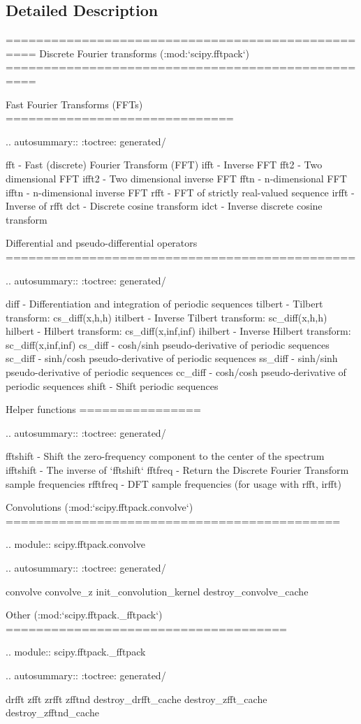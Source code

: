 \subsection{Detailed Description}
\begin{DoxyVerb}==================================================
Discrete Fourier transforms (:mod:`scipy.fftpack`)
==================================================

Fast Fourier Transforms (FFTs)
==============================

.. autosummary::
   :toctree: generated/

   fft - Fast (discrete) Fourier Transform (FFT)
   ifft - Inverse FFT
   fft2 - Two dimensional FFT
   ifft2 - Two dimensional inverse FFT
   fftn - n-dimensional FFT
   ifftn - n-dimensional inverse FFT
   rfft - FFT of strictly real-valued sequence
   irfft - Inverse of rfft
   dct - Discrete cosine transform
   idct - Inverse discrete cosine transform

Differential and pseudo-differential operators
==============================================

.. autosummary::
   :toctree: generated/

   diff - Differentiation and integration of periodic sequences
   tilbert - Tilbert transform:         cs_diff(x,h,h)
   itilbert - Inverse Tilbert transform: sc_diff(x,h,h)
   hilbert - Hilbert transform:         cs_diff(x,inf,inf)
   ihilbert - Inverse Hilbert transform: sc_diff(x,inf,inf)
   cs_diff - cosh/sinh pseudo-derivative of periodic sequences
   sc_diff - sinh/cosh pseudo-derivative of periodic sequences
   ss_diff - sinh/sinh pseudo-derivative of periodic sequences
   cc_diff - cosh/cosh pseudo-derivative of periodic sequences
   shift - Shift periodic sequences

Helper functions
================

.. autosummary::
   :toctree: generated/

   fftshift - Shift the zero-frequency component to the center of the spectrum
   ifftshift - The inverse of `fftshift`
   fftfreq - Return the Discrete Fourier Transform sample frequencies
   rfftfreq - DFT sample frequencies (for usage with rfft, irfft)


Convolutions (:mod:`scipy.fftpack.convolve`)
============================================

.. module:: scipy.fftpack.convolve

.. autosummary::
   :toctree: generated/

   convolve
   convolve_z
   init_convolution_kernel
   destroy_convolve_cache


Other (:mod:`scipy.fftpack._fftpack`)
=====================================

.. module:: scipy.fftpack._fftpack

.. autosummary::
   :toctree: generated/

   drfft
   zfft
   zrfft
   zfftnd
   destroy_drfft_cache
   destroy_zfft_cache
   destroy_zfftnd_cache\end{DoxyVerb}
 

